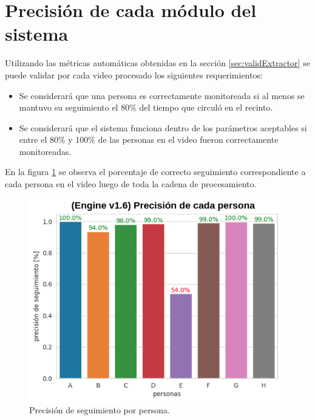 \newpage


\section{Precisión de cada módulo del sistema}
\label{sec:precisionSistema}

Utilizando las métricas automáticas obtenidas en la sección \ref{sec:validExtractor} se puede validar por cada video procesado los siguientes requerimientos:
\begin{itemize}
\item Se considerará que una persona es correctamente monitoreada si al menos se mantuvo su seguimiento el 80\% del tiempo que circuló en el recinto.
\item Se considerará que el sistema funciona dentro de los parámetros aceptables si entre el 80\% y 100\% de las personas en el video fueron correctamente monitoreadas.
\end{itemize}

En la figura \ref{fig:metricasPorPersona} se observa el porcentaje de correcto seguimiento correspondiente a cada persona en el video luego de toda la cadena de procesamiento.

\begin{figure}[ht]
	\centering
	\includegraphics[scale=.80]{./Figures/metricasPorPersona.png}
	\caption{Precisión de seguimiento por persona.}
	\label{fig:metricasPorPersona}
\end{figure}

